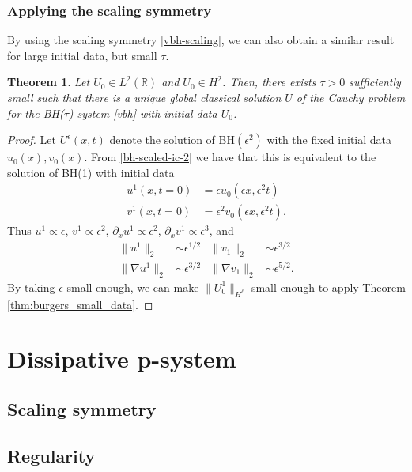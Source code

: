 \documentclass{article}
\theoremstyle{plain}
\newtheorem{theorem}{Theorem}
\theoremstyle{definition}
\numberwithin{theorem}{section}
\begin{document}
\subsubsection{Applying the scaling symmetry}
By using the scaling symmetry \eqref{vbh-scaling}, we can also obtain a similar result for large initial data, but small $\tau$.
\begin{theorem}
\label{thm:bh_small_tau}
    Let
    $U_0 \in L^2(\mathbb{R})$ and
    $U_0 \in H^2$.
    Then, there exists $\tau > 0$ sufficiently small such that
    there is a unique global classical solution $U$ of the Cauchy problem for the BH($\tau$) system \eqref{vbh}
    with initial data $U_0$.
\end{theorem}
\begin{proof}
    Let $U^\epsilon(x,t)$ denote the solution of
    BH$(\epsilon^2)$ with the fixed initial data $u_0(x),v_0(x)$.  From \eqref{bh-scaled-ic-2}
    we have that this is equivalent to the solution of BH(1) with initial data
    \begin{align*}
        u^1(x,t=0) & = \epsilon u_0(\epsilon x, \epsilon^2 t) \\
        v^1(x,t=0) & = \epsilon^2 v_0(\epsilon x, \epsilon^2 t).
    \end{align*}
    Thus $u^1 \propto \epsilon$, $v^1\propto \epsilon^2$, $\partial_x u^1 \propto \epsilon^2$,
    $\partial_x v^1 \propto \epsilon^3$, and
    \begin{align*}
        \|u^1\|_2 & \sim \epsilon^{1/2} & \|v_1\|_2 & \sim \epsilon^{3/2} \\
        \|\nabla u^1\|_2 & \sim \epsilon^{3/2} & \|\nabla v_1\|_2 & \sim \epsilon^{5/2}.
    \end{align*}
    By taking $\epsilon$ small enough, 
    we can make $\|U^1_0\|_{H^\ell}$ small enough to apply Theorem \ref{thm:burgers_small_data}.
\end{proof}


\section{Dissipative p-system}

\subsection{Scaling symmetry}

\subsection{Regularity}
\end{document}
